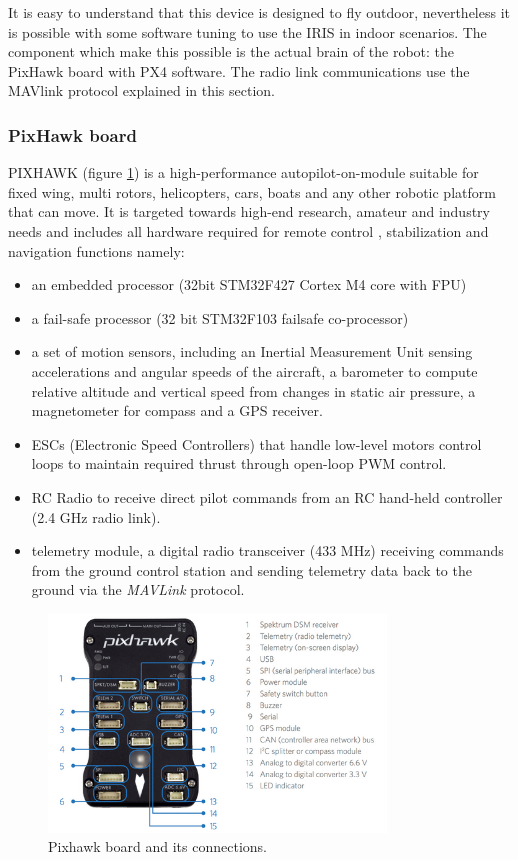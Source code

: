 It is easy to understand that this device is designed to fly outdoor, nevertheless it is possible with some software tuning to use the IRIS in indoor scenarios. The component which make this possible is the actual brain of the robot: the PixHawk board with PX4 software. The radio link communications use the MAVlink protocol explained in this section.

\subsubsection{PixHawk board}
\label{sec:pixboard}
PIXHAWK (figure \ref{figure:pixhawk}) is a high-performance autopilot-on-module suitable for fixed wing, multi rotors, helicopters, cars, boats and any other robotic platform that can move. It is targeted towards high-end research, amateur and industry needs and includes all hardware required for remote control \cite{PiXH}, stabilization and navigation functions namely:

\begin{itemize}
\item an embedded processor (32bit STM32F427 Cortex M4 core with FPU)
\item a fail-safe processor (32 bit STM32F103 failsafe co-processor)
\item a set of motion sensors, including an Inertial Measurement Unit sensing accelerations and angular speeds of the aircraft, a barometer to compute relative altitude and vertical speed from changes in static air pressure, a magnetometer for compass and a GPS receiver.

\item ESCs (Electronic Speed Controllers) that handle low-level motors control loops to maintain required thrust through open-loop PWM control.

\item RC Radio to receive direct pilot commands from an RC hand-held controller (2.4 GHz radio link).
\item telemetry module, a digital radio transceiver (433 MHz) receiving commands from the ground control station and sending telemetry data back to the ground via the \textit{MAVLink} protocol.
\end{itemize}

\begin{figure}[h]
 \centering
 \includegraphics[width=0.8\textwidth]{pixhawk.PNG}
 \caption[Pixhawk board]{Pixhawk board and its connections.}
 \label{figure:pixhawk}
\end{figure}


